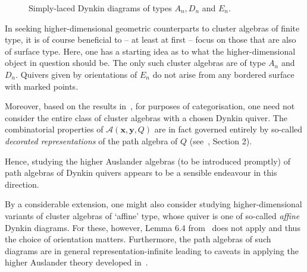 \documentclass[a4paper,oneside,svgnames]{amsart}
\theoremstyle{plain}
\theoremstyle{definition}
\begin{document}
\begin{figure}[ht]
\begin{subfigure}[b]{.6\textwidth}
  \end{subfigure}
  \caption{Simply-laced Dynkin diagrams of types $A_n,D_n$ and $E_n$.}
  \label{fig:dynkin-diagrams}
 \end{figure}

 In seeking higher-dimensional geometric counterparts to cluster algebras of
 finite type, it is of course beneficial to -- at least at first -- focus on
 those that are also of surface type. Here, one has a starting idea as to what
 the higher-dimensional object in question should be. The only such cluster
 algebras are of type $A_n$ and $D_n$.  Quivers given by orientations of $E_n$
 do not arise from any bordered surface with marked points.  

 Moreover, based on the results in~\cite{bma}, for purposes of categorisation,
 one need not consider the entire class of cluster algebras with a chosen Dynkin
 quiver. The combinatorial properties of $\mathcal{A}(\mathbf{x},\mathbf{y},Q)$
 are in fact governed entirely by so-called \emph{decorated representations} of
 the path algebra of $Q$ (see~\cite{bma}, Section 2).

 Hence, studying the higher Auslander algebras (to be introduced promptly) of
 path algebras of Dynkin quivers appears to be a sensible endeavour in this
 direction.

 By a considerable extension, one might also consider studying
 higher-dimensional variants of cluster algebras of `affine' type, whose quiver
 is one of so-called \emph{affine} Dynkin diagrams. For these, however, Lemma
 6.4 from~\cite{fst} does not apply and thus the choice of orientation matters.
 Furthermore, the path algebras of such diagrams are in general
 representation-infinite leading to caveats in applying the higher Auslander
 theory developed in~\cite{iyama}.
\end{document}
